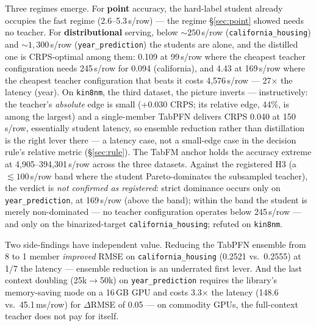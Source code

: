 \documentclass[11pt]{article}
\newcommand{\us}{\textmu s}
\begin{document}
Three regimes emerge. For \textbf{point} accuracy, the hard-label
student already occupies the fast regime (2.6--5.3\,\us/row) --- the
regime \S\ref{sec:point} showed needs no teacher. For \textbf{distributional} serving, below
${\sim}250$\,\us/row (\texttt{california\_\allowbreak housing}) and
${\sim}1{,}300$\,\us/row (\texttt{year\_\allowbreak prediction}) the students are
alone, and the distilled one is CRPS-optimal among them: 0.109 at
99\,\us/row where the cheapest teacher configuration needs 245\,\us/row for
0.094 (california), and 4.43 at 169\,\us/row where the cheapest teacher
configuration that beats it costs 4{,}576\,\us/row --- 27$\times$ the
latency (year). On \texttt{kin8nm}, the third dataset, the picture
inverts --- instructively: the teacher's \emph{absolute} edge is
small ($+0.030$ CRPS; its relative edge, 44\%, is among the largest)
and a single-member TabPFN delivers CRPS 0.040 at 150\,\us/row,
essentially student latency, so ensemble reduction rather than
distillation is the right lever there --- a latency case, not a
small-edge case in the decision rule's relative metric
(\S\ref{sec:rule}). The TabFM anchor holds the
accuracy extreme at 4{,}905--394{,}301\,\us/row across the three
datasets. Against the registered H3 (a ${\lesssim}100$\,\us/row
band where the student Pareto-dominates the subsampled teacher), the
verdict is \emph{not confirmed as registered}: strict dominance
occurs only on \texttt{year\_\allowbreak prediction}, at
169\,\us/row (above the band); within the band the student is
merely non-dominated --- no teacher configuration operates below
245\,\us/row --- and only on the binarized-target
\texttt{california\_\allowbreak housing}; refuted on
\texttt{kin8nm}.

Two side-findings have independent value. Reducing the TabPFN ensemble from
8 to 1 member \emph{improved} RMSE on \texttt{california\_\allowbreak housing} (0.2521
vs.\ 0.2555) at 1/7 the latency --- ensemble reduction is an underrated
first lever. And the last context doubling (25k$\to$50k) on
\texttt{year\_\allowbreak prediction} requires the library's memory-saving mode on a
16\,GB GPU and costs 3.3$\times$ the latency (148.6 vs.\ 45.1\,ms/row) for
$\Delta$RMSE of 0.05 --- on commodity GPUs, the full-context teacher does
not pay for itself.
\end{document}
